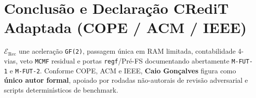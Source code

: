 \documentclass[10pt,twocolumn]{article}
\begin{document}
\section{Conclus\~{a}o e Declara\c{c}\~{a}o CRediT Adaptada (COPE / ACM / IEEE)}

$\mathcal{E}_{\mathrm{Rec}}$ une acelera\c{c}\~{a}o \texttt{GF(2)}, passagem \'{u}nica em RAM limitada, contabilidade 4-vias, veto \texttt{MCMF} residual e portas \texttt{regf}/Pr\'{e}-FS documentando abertamente \texttt{M-FUT-1} e \texttt{M-FUT-2}. Conforme COPE, ACM e IEEE, \textbf{Caio Gon\c{c}alves} figura como \textbf{\'{u}nico autor formal}, apoiado por rodadas n\~{a}o-autorais de revis\~{a}o adversarial e scripts determin\'{\i}sticos de benchmark.



\end{document}
